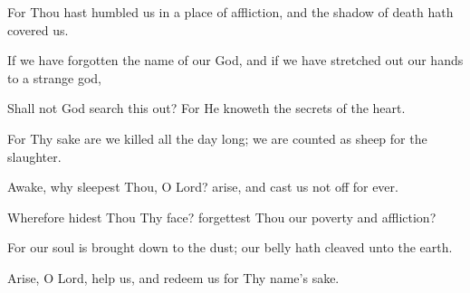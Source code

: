 For Thou hast humbled us in a place of affliction, and the shadow of death hath covered us.

If we have forgotten the name of our God, and if we have stretched out our hands to a strange god,

Shall not God search this out? For He knoweth the secrets of the heart.

For Thy sake are we killed all the day long; we are counted as sheep for the slaughter.

Awake, why sleepest Thou, O Lord? arise, and cast us not off for ever.

Wherefore hidest Thou Thy face? forgettest Thou our poverty and affliction?

For our soul is brought down to the dust; our belly hath cleaved unto the earth.

Arise, O Lord, help us, and redeem us for Thy name's sake.
